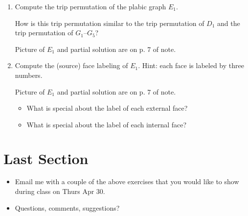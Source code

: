 \documentclass[10pt]{amsart}
\begin{document}
\begin{enumerate}
\item 
Compute the trip permutation of the plabic graph $E_1$. 

How is this trip permutation similar to the trip permutation of $D_1$ and the trip permutation of $G_1$--$G_5$?




Picture of $E_1$ and partial solution are on p. 7 of note.



\item 
Compute the (source) face labeling of $E_1$. Hint: each face is labeled by three numbers.

Picture of $E_1$ and partial solution are on p. 7 of note.


\begin{itemize}
	\item
	What is special about the label of each external face?
	\item 
	What is special about the label of each internal face?
\end{itemize}



\end{enumerate}



\section*{Last Section}
\begin{itemize}
	\item 
	Email me with a couple of the above exercises that you would like to show during class on Thurs Apr 30.
	\item
	Questions, comments, suggestions?
\end{itemize}
\end{document}
